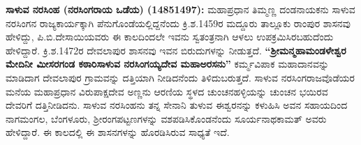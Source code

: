 \textbf{ಸಾಳುವ ನರಸಿಂಹ (ನರಸಿಂಗರಾಯ ಒಡೆಯ) (1485\general{\enginline{-}}1497):} ಮಹಾಪ್ರಧಾನ ತಿಮ್ಮಣ್ಣ ದಂಡನಾಯಕನು ಸಾಳುವ ನರಸಿಂಗನ ರಾಜ್ಯಕಾರ್ಯಕ್ಕಾಗಿ ಪೆನುಗೊಂಡೆಯಲ್ಲಿದ್ದನೆಂದು ಕ್ರಿ.ಶ.1459ರ ಮದ್ದೂರು ತಾಲ್ಲೂಕು ರಾಂಪುರ ಶಾಸನವು ಹೇಳಿದ್ದು, ಪಿ.ಬಿ.ದೇಸಾಯಿಯವರು ಈ ಕಾಲದಿಂದಲೇ ಇವನು ಸ್ವತಂತ್ರನಾಗಿ ಆಳಲು ಉಪಕ್ರಮಿಸಿರಬಹುದೆಂದು ಹೇಳಿದ್ದಾರೆ. ಕ್ರಿ.ಶ.1472ರ ದೇವಲಾಪುರ ಶಾಸನವು ಇವನ ಬಿರುದುಗಳನ್ನು ನೀಡುತ್ತದೆ. \textbf{“ಶ‍್ರೀಮನ್ಮಹಾಮಂಡಳೇಶ್ವರ ಮೇದಿನೀ ಮೀಸರಗಂಡ ಕಠಾರಿಸಾಳುವ ನರಸಿಂಗಯ್ಯದೇವ ಮಹಾಅರಸನು”} ಕರ್ಮ್ಮವಿಪಾಕ ಮಹಾದಾನವನ್ನು ಮಾಡಿದಾಗ ದೇವಲಾಪುರ ಗ್ರಾಮವನ್ನು ದತ್ತಿಯಾಗಿ ನೀಡಿದನೆಂದು ತಿಳಿದುಬರುತ್ತದೆ. ಸಾಳುವ ನರಸಿಂಗರಾಜವೊಡೆಯರ ಮನೆಯ ಮಹಾಪ್ರಧಾನ ವಿರುಪಾಕ್ಷದೇವ ಅಣ್ಣನು ಆರಣಿಯ ಸ್ಥಳದ ಚುಂಚನಹಳ್ಳಿಯನ್ನು ಚುಂಚನ ಭಯಿರವ ದೇವರಿಗೆ ದತ್ತಿ\break ನೀಡಿದನು. ಸಾಳುವ ನರಸಿಂಹನು ತನ್ನ ಸೇನಾನಿ ತುಳುವ ಈಶ್ವರನನ್ನು ಕಳುಹಿಸಿ ಅವನ ಸಹಾಯದಿಂದ ನಾಗಮಂಗಲ, ಬೆಂಗಳೂರು, ಶ‍್ರೀರಂಗಪಟ್ಟಣಗಳನ್ನು ವಶಪಡಿಸಿಕೊಂಡನೆಂದು ಸೂರ್ಯನಾಥಕಾಮತ್​ ಅವರು ಹೇಳಿದ್ದಾರೆ. ಈ ಕಾಲದಲ್ಲಿ ಈ ಶಾಸನಗಳನ್ನು ಹೊರಡಿಸಿರುವ ಸಾಧ್ಯತೆ ಇದೆ.

